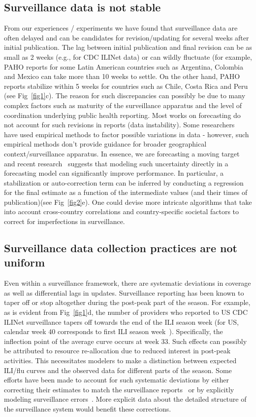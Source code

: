 \documentclass[10pt,letterpaper]{article}
\begin{document}
\subsection*{Surveillance data is not stable}
From our experiences / experiments we have found that surveillance data
are often delayed and can be candidates for revision/updating for several weeks
after initial publication. The lag between initial publication and final
revision can be as small as 2 weeks (e.g., for CDC ILINet data) or can wildly
fluctuate (for example, PAHO reports for some Latin American countries such as
Argentina, Colombia and Mexico can take more than 10 weeks to settle. On the
other hand, PAHO reports stabilize within 5 weeks for countries such as Chile,
Costa Rica and Peru (see Fig~\ref{fig1}c).
The reason for such discrepancies can possibly be due to many complex factors
such as maturity of the surveillance apparatus and the level of coordination
underlying public health reporting.
Most works on forecasting do not account for such revisions in reports (data
instability).  Some researchers~\cite{shaman2013real,goldstein2011predicting}
have used empirical methods to factor possible variations in data - however, such empirical 
methods don't provide guidance for broader geographical context/surveillance apparatus.
In essence, we are forecasting a moving target and recent
research~\cite{fischhoff2014communicating} suggests that modeling such
uncertainty directly in a forecasting model can significantly improve
performance. In particular, a stabilization or auto-correction term can be
inferred by conducting a regression for the final estimate as a function of the
intermediate values (and their times of publication)(see Fig~\ref{fig2}e).  One
could devise more intricate algorithms that take into account cross-country
correlations and country-specific societal factors to correct for imperfections
in surveillance. 

\subsection*{Surveillance data collection practices are not uniform}
Even within a surveillance framework, there are systematic deviations in
coverage as well as differential lags in updates. Surveillance reporting has
been known to taper off or stop altogether during the post-peak part of the
season. For example, as is evident from Fig~\ref{fig1}d, the number of
providers who reported to US CDC ILINet surveillance tapers off towards the end
of the ILI season week (for US, calendar week 40 corresponds to first ILI
season week~\cite{cdc}).  Specifically, the inflection point of the average
curve occurs at week 33. Such effects can possibly be attributed to resource
re-allocation due to reduced interest in post-peak activities. This
necessitates modelers to make a distinction between expected ILI/flu curves and
the observed data for different parts of the season. Some efforts have been
made to account for such systematic deviations by either correcting their
estimates to match the surveillance reports~\cite{chakraborty2014forecasting}
or by explicitly modeling surveillance errors~\cite{shaman2013real}.  More
explicit data about the detailed structure of the surveillance system would
benefit these corrections.
\end{document}

